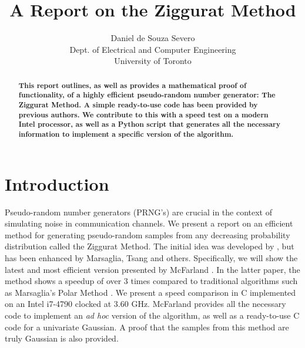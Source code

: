 \documentclass[11pt,onecolumn]{article}
\begin{document}
\title{A Report on the Ziggurat Method}
\author{Daniel de Souza Severo\\
Dept. of Electrical and Computer Engineering\\
University of Toronto}
\maketitle
\begin{abstract}

\textbf{This report outlines, as well as provides a mathematical proof of functionality, of a highly efficient pseudo-random number generator: The Ziggurat Method. A simple ready-to-use code has been provided by previous authors. We contribute to this with a speed test on a modern Intel processor, as well as a Python script that generates all the necessary information to implement a specific version of the algorithm.}
\end{abstract}

\section{Introduction}
Pseudo-random number generators (PRNG's) are crucial in the context of simulating noise in communication channels. We present a report on an efficient method for generating pseudo-random samples from any decreasing probability distribution called the Ziggurat Method. The initial idea was developed by \cite{marsaglia}, but has been enhanced by Marsaglia, Tsang \cite{marsaglia&tsang} and others. Specifically, we will show the latest and most efficient version presented by McFarland \cite{mcfarland}. In the latter paper, the method shows a speedup of over 3 times compared to traditional algorithms such as Marsaglia's Polar Method \cite{marsagliapolar}. We present a speed comparison in C implemented on an Intel i7-4790 clocked at 3.60 GHz. McFarland \cite{mcfarland} provides all the necessary code to implement an \textit{ad hoc} version of the algorithm, as well as a ready-to-use C code for a univariate Gaussian. A proof that the samples from this method are truly Gaussian is also provided.
\end{document}
